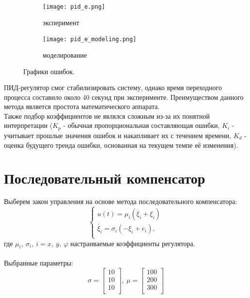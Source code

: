 \documentclass[12pt]{article}
\begin{document}
\begin{figure}[H]
    \centering
    \begin{subfigure}{0.49\textwidth}
        \centering
        \texttt{[image: pid\_e.png]}
        \caption{эксперимент}
         \label{fig:pid_e.png}
     \end{subfigure}
     \hfill
     \begin{subfigure}{0.49\textwidth}
         \centering
         \texttt{[image: pid\_e\_modeling.png]}
         \caption{моделирование}
         \label{fig:pid_e_modeling.png}
     \end{subfigure}
    \caption{Графики ошибок.}
    \label{fig:two graphs}
\end{figure}

ПИД-регулятор смог стабилизировать систему, однако время переходного процесса составило около 40 секунд при эксперименте. Преимуществом данного метода является простота математического аппарата.\\
Также подбор коэффициентов не являлся сложным из-за их понятной интерпретации ($K_p$ - обычная пропорциональная составляющая ошибки, $K_i$ - учитывает прошлые значения ошибок и накапливает их с течением времени, $K_d$ - оценка будущего тренда ошибки, основанная на текущем темпе её изменения).

\section*{Последовательный компенсатор}
Выберем закон управления на основе метода последовательного компенсатора:
\[
\begin{cases}
    u(t) = \mu_i(\dot{\xi_i} + \xi_i) \\
    \dot{\xi_i} = \sigma_i(-\xi_i + e_i), \\
\end{cases}
\]
где $\mu_i, \ \sigma_i, \ i = x, \ y, \ \varphi$ настраиваемые коэффициенты регулятора.\\
\ \\
Выбранные параметры:
\[
\sigma = \begin{bmatrix}
    10 \\ 10 \\ 10 \\
\end{bmatrix}, \ \mu = \begin{bmatrix}
    100 \\ 200 \\ 300 \\
\end{bmatrix}
\]
\end{document}
